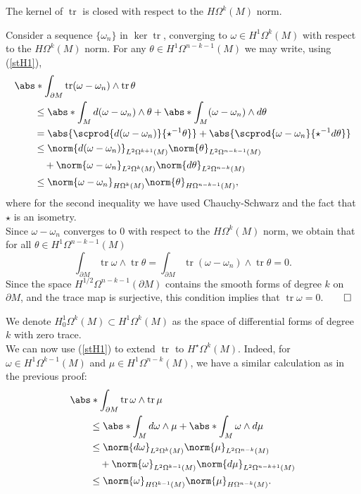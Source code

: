 \documentclass{ifacconf}
\newcommand{\tr}{\operatorname{tr}}
\newcommand{\drh}[2]{\Omega^{#2}(#1)}
\begin{document}
\begin{lem}\label{closedker}
    The kernel of $\tr$ is closed with respect to the $H\drh{M}{k}$ norm.
    \begin{pf}
        Consider a sequence $\{\omega_n\}$ in $\operatorname{ker}\tr$, converging to $\omega\in H^1\drh{M}{k}$ with respect to the $H\drh{M}{k}$ norm. For any $\theta\in H^1\drh{M}{n-k-1}$ we may write, using (\ref{stH1}),
        \begin{align*}
            \MoveEqLeft
            \abs*{\int_{\partial M} \tr(\omega-\omega_n)\wedge\tr\theta}\\
            &\leq \abs*{\int_M d(\omega-\omega_n)\wedge\theta} + \abs*{\int_M (\omega-\omega_n)\wedge d\theta}\\
            &= \abs{\scprod{d(\omega-\omega_n)}{\star^{-1}\theta}} +\abs{\scprod{\omega-\omega_n}{\star^{-1}d\theta}}\\
            &\leq \norm{d(\omega-\omega_n)}_{L^2\drh{M}{k+1}}\norm{\theta}_{L^2\drh{M}{n-k-1}} \\
            &\quad +\norm{\omega-\omega_n}_{L^2\drh{M}{k}}\norm{d\theta}_{L^2\drh{M}{n-k}}\\ 
            &\leq \norm{\omega-\omega_n}_{H\drh{M}{k}}\norm{\theta}_{H\drh{M}{n-k-1}},
        \end{align*}
        where for the second inequality we have used Chauchy-Schwarz and the fact that $\star$ is an isometry.\\
        Since $\omega-\omega_n$ converges to $0$ with respect to the $H\drh{M}{k}$ norm, we obtain that for all $\theta\in H^1\drh{M}{n-k-1}$
        \[
            \int_{\partial M} \tr\omega\wedge\tr\theta=\int_{\partial M} \tr(\omega-\omega_n)\wedge\tr\theta = 0.
        \]
        Since the space $H^{1/2}\drh{\partial M}{n-k-1}$ contains the smooth forms of degree $k$ on $\partial M$, and the trace map is surjective, this condition implies that $\tr\omega=0$.\hfill $\qed$
    \end{pf}
\end{lem}
We denote $H^1_0\drh{M}{k}\subset H^1\drh{M}{k}$ as the space of differential forms of degree $k$ with zero trace.\\
We can now use  (\ref{stH1}) to extend $\tr$ to $H^{\star}\drh{M}{k}$. Indeed, for $\omega\in H^1\drh{M}{k-1}$ and $\mu\in H^1\drh{M}{n-k}$, we have a similar calculation as in the previous proof:
\begin{align*}
    \MoveEqLeft
    \abs*{\int_{\partial M} \tr\omega\wedge\tr\mu}\\
    &\leq
    \abs*{\int_M d\omega\wedge \mu}+\abs*{\int_M \omega\wedge d\mu}\\
    &\leq \norm{d\omega}_{L^2\drh{M}{k}}\norm{\mu}_{L^2\drh{M}{n-k}} \\
    &\quad + \norm{\omega}_{L^2\drh{M}{k-1}}\norm{d\mu}_{L^2\drh{M}{n-k+1}}\\
    &\leq \norm{\omega}_{H\drh{M}{k-1}}\norm{\mu}_{H\drh{M}{n-k}}.
\end{align*}
\end{document}

